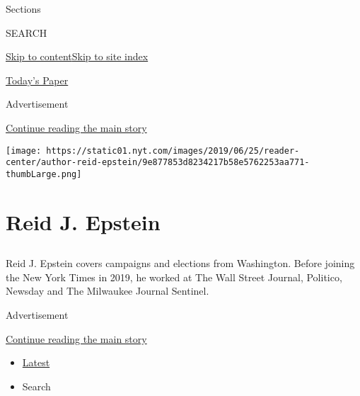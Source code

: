 Sections

SEARCH

\protect\hyperlink{site-content}{Skip to
content}\protect\hyperlink{site-index}{Skip to site index}

\href{https://myaccount.nytimes.com/auth/login?response_type=cookie\&client_id=vi}{}

\href{https://www.nytimes.com/section/todayspaper}{Today's Paper}

Advertisement

\protect\hyperlink{after-top}{Continue reading the main story}

\texttt{[image: https://static01.nyt.com/images/2019/06/25/reader-center/author-reid-epstein/9e877853d8234217b58e5762253aa771-thumbLarge.png]}

\hypertarget{reid-j-epstein}{%
\section{Reid J. Epstein}\label{reid-j-epstein}}

\subsection{}

Reid J. Epstein covers campaigns and elections from Washington. Before
joining the New York Times in 2019, he worked at The Wall Street
Journal, Politico, Newsday and The Milwaukee Journal Sentinel.

Advertisement

\protect\hyperlink{after-mid1}{Continue reading the main story}

\begin{itemize}
\tightlist
\item
  \protect\hyperlink{stream-panel}{Latest}
\item
  Search
\end{itemize}

